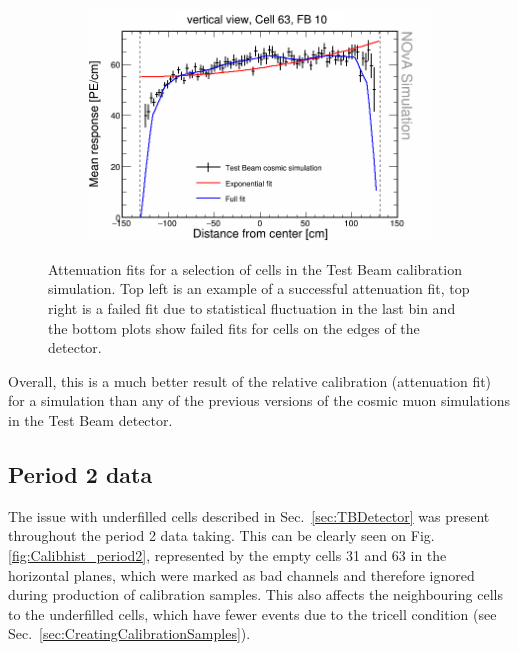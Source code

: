 \begin{figure}[h]
\begin{subfigure}{0.5\textwidth}
  \end{subfigure}
  \begin{subfigure}{0.5\textwidth}
    \includegraphics[width=\linewidth]{RelativeCalibrationResults/sim_fb10_000_063.png}
  \end{subfigure}
  \caption{Attenuation fits for a selection of cells in the Test Beam calibration simulation. Top left is an example of a successful attenuation fit, top right is a failed fit due to statistical fluctuation in the last bin and the bottom plots show failed fits for cells on the edges of the detector.}
  \label{fig:AttenfitResultsSimulation}
\end{figure}

Overall, this is a much better result of the relative calibration (attenuation fit) for a simulation than any of the previous versions of the cosmic muon simulations in the Test Beam detector.

\FloatBarrier
\subsection{Period 2 data}
The issue with underfilled cells described in Sec.~\ref{sec:TBDetector} was present throughout the period 2 data taking. This can be clearly seen on Fig. \ref{fig:Calibhist_period2}, represented by the empty cells 31 and 63 in the horizontal planes, which were marked as bad channels and therefore ignored during production of calibration samples. This also affects the neighbouring cells to the underfilled cells, which have fewer events due to the tricell condition (see Sec.~\ref{sec:CreatingCalibrationSamples}).

